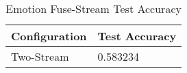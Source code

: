 \begin{table}[H] \centering

\makeatletter
\def\rulecolor#1#{\CT@arc{#1}}
\def\CT@arc#1#2{%
\ifdim\baselineskip=\z@\noalign\fi
{\gdef\CT@arc@{\color#1{#2}}}}
\let\CT@arc@\relax
{}
\makeatother

\begin{tabular}{@{}l|l@{}}
	\toprule
    Configuration & Test Accuracy \\
    
    \midrule
    Two-Stream & 0.583234 \\    
    
    \bottomrule
\end{tabular}
    
	\caption{Emotion Fuse-Stream Test Accuracy} 
    \label{table:fake-emotion_fuse}

\end{table}